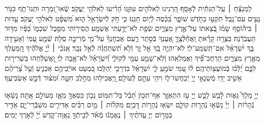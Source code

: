 \documentclass[twoside, openany, parskip=half, 11pt]{book}
\begin{document}
{
\begin{narrow}
לַמְנַצֵּ֬חַ ׀ עַֽל־הַגִּתִּ֬ית לְֿאָסָֽף׃
הַ֭רְנִינוּ לֵאלֹהִ֣ים עוּזֵּ֑נוּ הָ֝רִ֗יעוּ לֵאלֹהֵ֥י יַעֲקֹֽב׃
שְֽֿׂאוּ־זִ֭מְרָה וּתְנוּ־תֹ֑ף כִּנּ֖וֹר נָעִ֣ים עִם־נָֽבֶל׃
תִּקְע֣וּ בַחֹ֣דֶשׁ שׁוֹפָ֑ר בַּ֝כֵּ֗סֶה לְֿי֣וֹם חַגֵּֽנוּ׃
כִּ֤י חֹ֣ק לְֿיִשְׂרָאֵ֣ל ה֑וּא מִ֝שְׁפָּ֗ט לֵאלֹהֵ֥י יַעֲקֹֽב׃
עֵ֤דוּת ׀ בִּיה֘וֹסֵ֤ף שָׂמ֗וֹ בְּֿ֭צֵאתוֹ עַל־אֶ֣רֶץ מִצְרָ֑יִם שְֿׂפַ֖ת לֹא־יָדַ֣עְתִּי אֶשְׁמָֽע׃
הֲסִיר֣וֹתִי מִסֵּ֣בֶל שִׁכְמ֑וֹ כַּ֝פָּ֗יו מִדּ֥וּד תַּעֲבֹֽרְֿנָה׃ 
בַּצָּרָ֥ה קָרָ֗אתָ וָאֲחַ֫לְּֿצֶ֥ךָּ אֶ֭עֶנְךָ בְּֿסֵ֣תֶר רַ֑עַם אֶבְחׇנְךָ֨ עַל־מֵ֖י מְֿרִיבָ֣ה סֶֽלָה׃ 
שְֿׁמַ֣ע עַ֭מִּי וְֿאָעִ֣ידָה בָּ֑ךְ יִ֝שְׂרָאֵ֗ל אִם־תִּֽשְׁמַֽע־לִֽי׃
לֹא־יִהְיֶ֣ה בְֿ֭ךָ אֵ֣ל זָ֑ר וְֿלֹ֥א תִ֝שְׁתַּחֲוֶ֗ה לְֿאֵ֣ל נֵכָֽר׃
אָֽנֹכִ֨י ׀ יְ֘יָ֤ אֱלֹהֶ֗יךָ הַֽ֭מַּעַלְךָ מֵאֶ֣רֶץ מִצְרָ֑יִם הַרְחֶב־פִּ֗֝יךָ וַאֲמַלְאֵֽהוּ׃
וְֿלֹֽא־שָׁמַ֣ע עַמִּ֣י לְֿקוֹלִ֑י וְֿ֝יִשְׂרָאֵ֗ל לֹא־אָ֥בָה לִֽי׃
וָ֭אֲשַׁלְּֿחֵהוּ בִּשְׁרִיר֣וּת לִבָּ֑ם יֵ֝לְֿכ֗וּ בְּֽֿמוֹעֲצ֖וֹתֵיהֶֽם׃
ל֗וּ עַ֭מִּי שֹׁמֵ֣עַֽ לִ֑י יִ֝שְׂרָאֵ֗ל בִּדְרָכַ֥י יְֿהַלֵּֽכוּ׃
כִּ֭מְעַט אוֹיְֿבֵיהֶ֣ם אַכְנִ֑יעַ וְֿעַ֥ל צָ֝רֵיהֶ֗ם אָשִׁ֥יב יָדִֽי׃
מְֿשַׂנְאֵ֣י יְיָ֭ יְֿכַחֲשׁוּ־ל֑וֹ וִיהִ֖י עִתָּ֣ם לְֿעוֹלָֽם׃
וַֽ֭יַּאֲכִילֵהוּ מֵחֵ֣לֶב חִטָּ֑ה וּ֝מִצּ֗וּר דְּֿבַ֣שׁ אַשְׂבִּיעֶֽךָ׃
\end{narrow}

\begin{narrow}
יְיָ֣ מָלָךְ֮ גֵּא֢וּת לָ֫בֵ֥שׁ
לָבֵ֣שׁ יְיָ֭ עֹ֣ז הִתְאַזָּ֑ר אַף־תִּכּ֥וֹן תֵּ֝בֵ֗ל בַּל־תִּמּֽוֹט׃
נָכ֣וֹן כִּסְאֲךָ֣ מֵאָ֑ז מֵעוֹלָ֣ם אָֽתָּה׃
נָשְֿׂא֤וּ נְֿהָר֨וֹת ׀ יְיָ֗ נָשְֿׂא֣וּ נְֿהָר֣וֹת קוֹלָ֑ם יִשְׂא֖וּ נְֿהָר֣וֹת דׇּכְיָֽם׃
מִקֹּל֨וֹת ׀ מַ֤יִם רַבִּ֗ים אַדִּירִ֣ים מִשְׁבְּֿֿרֵי־יָ֑ם אַדִּ֖יר בַּמָּר֣וֹם יְיָ׃
עֵֽדֹתֶ֨יךָ ׀ נֶאֶמְנ֬וּ מְֿאֹ֗ד לְֿבֵיתְֿךָ֥ נַאֲוָה־קֹ֑דֶשׁ יְ֝יָ֗ לְֿאֹ֣רֶךְ יָמִֽים׃
\end{narrow}
}

\weekdayshir
\end{document}
